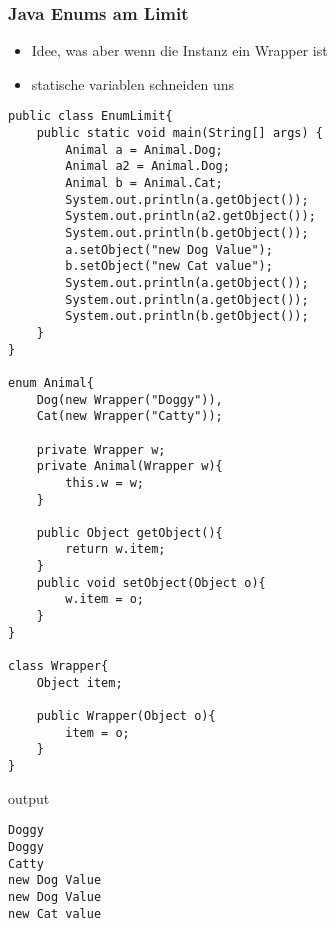 \documentclass[a4paper, 1ppt]{article}
\begin{document}
\subsubsection{Java Enums am Limit}
\begin{itemize}
	\item Idee, was aber wenn die Instanz ein Wrapper ist
	\item statische variablen schneiden uns 
\end{itemize}
\begin{verbatim}
public class EnumLimit{
	public static void main(String[] args) {
		Animal a = Animal.Dog;
		Animal a2 = Animal.Dog;
		Animal b = Animal.Cat;
		System.out.println(a.getObject());
		System.out.println(a2.getObject());
		System.out.println(b.getObject());
		a.setObject("new Dog Value");
		b.setObject("new Cat value");
		System.out.println(a.getObject());
		System.out.println(a.getObject());
		System.out.println(b.getObject());
	}
}

enum Animal{
	Dog(new Wrapper("Doggy")),
	Cat(new Wrapper("Catty"));

	private Wrapper w;
	private Animal(Wrapper w){
		this.w = w;
	}

	public Object getObject(){
		return w.item;
	}
	public void setObject(Object o){
		w.item = o;
	}
}

class Wrapper{
	Object item;

	public Wrapper(Object o){
		item = o;
	}
}
\end{verbatim}
output
\begin{verbatim}
Doggy
Doggy
Catty
new Dog Value
new Dog Value
new Cat value
\end{verbatim}
\newpage
\end{document}
